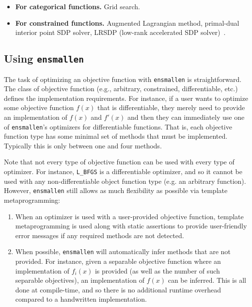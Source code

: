 \begin{itemize}
  \item {\bf For categorical functions.}  Grid search.

  \item {\bf For constrained functions.}  Augmented Lagrangian method,
primal-dual interior point SDP solver, LRSDP (low-rank accelerated SDP
solver)~\cite{burer2003nonlinear}.
\end{itemize}

\subsection{Using {\tt ensmallen}}

The task of optimizing an objective function with {\tt ensmallen} is
straightforward.  The class of objective function (e.g., arbitrary, constrained,
differentiable, etc.) defines the implementation requirements.  For instance, if
a user wants to optimize some objective function $f(x)$ that is differentiable,
they merely need to provide an implementation of $f(x)$ and $f'(x)$ and then
they can immediately use one of {\tt ensmallen}'s optimizers for differentiable
functions.  That is, each objective function type has some minimal set of
methods that must be implemented.  Typically this is only between one and four
methods.

Note that not every type of objective function can be used with every type of
optimizer.  For instance, {\tt L\_BFGS} is a differentiable optimizer, and so it
cannot be used with any non-differentiable object function type (e.g. an
arbitrary function).  However, {\tt ensmallen} still allows as much flexibility
as possible via template metaprogramming:

\begin{enumerate}
  \item When an optimizer is used with a user-provided objective function,
template metaprogramming is used along with static assertions to provide
user-friendly error messages if any required methods are not detected.

  \item When possible, {\tt ensmallen} will automatically infer methods that are
not provided.  For instance, given a separable objective function where an
implementation of $f_i(x)$ is provided (as well as the number of such separable
objectives), an implementation of $f(x)$ can be inferred.  This is all done at
compile-time, and so there is no additional runtime overhead compared to a
handwritten implementation.
\end{enumerate}

